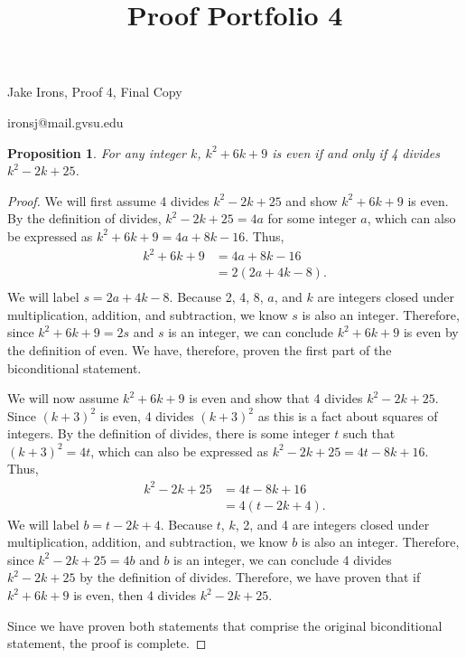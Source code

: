 \documentclass[11 pt]{article}
\title{Proof Portfolio 4}
\newtheorem{proposition}{Proposition}
\newcommand{\newpar}{\vspace{.15in}\noindent}
\begin{document}
\noindent Jake Irons, Proof 4, Final Copy

\noindent ironsj@mail.gvsu.edu

\newpar
\begin{proposition}
For any integer $k$, $k^2+6k+9$ is even if and only if 4 divides $k^2-2k+25$.
\end{proposition}
\begin{proof}
We will first assume 4 divides $k^2-2k+25$ and show $k^2+6k+9$ is even. By the definition of divides, $k^2-2k+25=4a$ for some integer $a$, which can also be expressed as $k^2+6k+9=4a+8k-16$. Thus,
\begin{align*}
k^2+6k+9&=4a+8k-16 \\
&=2(2a+4k-8). \\
\end{align*}
\noindent We will label $s=2a+4k-8$. Because 2, 4, 8, $a$, and $k$ are integers closed under multiplication, addition, and subtraction, we know $s$ is also an integer. Therefore, since $k^2+6k+9=2s$ and $s$ is an integer, we can conclude $k^2+6k+9$ is even by the definition of even. We have, therefore, proven the first part of the biconditional statement.

\newpar
\noindent We will now assume $k^2+6k+9$ is even and show that 4 divides $k^2-2k+25$. Since $(k+3)^2$ is even, 4 divides $(k+3)^2$ as this is a fact about squares of integers. By the definition of divides, there is some integer $t$ such that $(k+3)^2=4t$, which can also be expressed as $k^2-2k+25=4t-8k+16$. Thus,
\begin{align*}
k^2-2k+25&=4t-8k+16 \\
&=4(t-2k+4).
\end{align*}
\noindent We will label $b=t-2k+4$. Because $t$, $k$, 2, and 4 are integers closed under multiplication, addition, and subtraction, we know $b$ is also an integer. Therefore, since $k^2-2k+25=4b$ and $b$ is an integer, we can conclude 4 divides $k^2-2k+25$ by the definition of divides. Therefore, we have proven that if $k^2+6k+9$ is even, then 4 divides $k^2-2k+25$.



\newpar
Since we have proven both statements that comprise the original biconditional statement, the proof is complete.
\end{proof}
\end{document}
